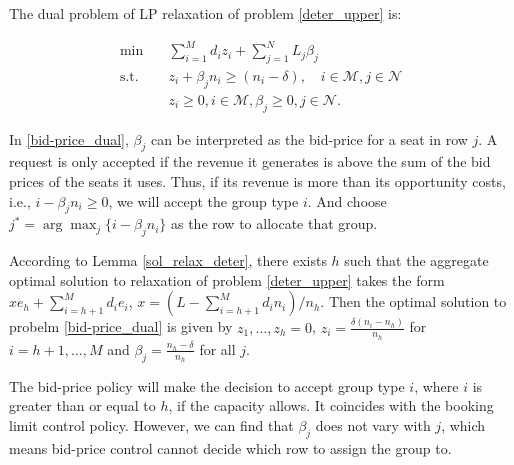 The dual problem of LP relaxation of problem \eqref{deter_upper} is:

\begin{equation}\label{bid-price_dual}
  \begin{aligned}
  \min \quad & \sum_{i=1}^{M} d_i z_i + \sum_{j= 1}^{N} L_j \beta_{j} \\
  \text {s.t.} \quad & z_{i} + \beta_j n_i \geq (n_i-\delta), \quad i \in \mathcal{M}, j \in \mathcal{N} \\
  & z_{i} \geq 0, i \in \mathcal{M}, \beta_{j} \geq 0, j \in \mathcal{N}.
  \end{aligned}
\end{equation}

In \eqref{bid-price_dual}, $\beta_{j}$ can be interpreted as the bid-price for a seat in row $j$. A request is only accepted if the revenue it generates is above the sum of the bid prices of the seats it uses. Thus, if its revenue is more than its opportunity costs, i.e., $i -\beta_{j} n_i \geq 0$, we will accept the group type $i$. And choose $j^{*} = \arg \max_{j} \{i -\beta_{j} n_i\}$ as the row to allocate that group.


\begin{lem}\label{bid-price}
According to Lemma \ref{sol_relax_deter}, there exists $h$ such that the aggregate optimal solution to relaxation of problem \eqref{deter_upper} takes the form $x e_{h} + \sum_{i=h+1} ^{M} d_{i} e_{i}$, $x = (L- \sum_{i = h+1}^{M} {d_i n_i})/ n_h$. Then the optimal solution to probelm \eqref{bid-price_dual} is given by $z_1 ,\ldots, z_h =0$, $z_{i} = \frac{\delta(n_i-n_h)}{n_h}$ for $i = h+1, \ldots, M$ and $\beta_j = \frac{n_h - \delta}{n_h}$ for all $j$. 
\end{lem}

The bid-price policy will make the decision to accept group type $i$, where $i$ is greater than or equal to $h$, if the capacity allows. It coincides with the booking limit control policy. However, we can find that $\beta_{j}$ does not vary with $j$, which means bid-price control cannot decide which row to assign the group to.

